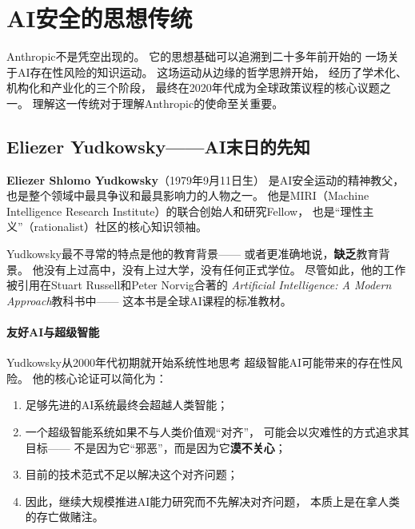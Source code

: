 \section{AI安全的思想传统}
\label{sec:safety-tradition}

Anthropic不是凭空出现的。
它的思想基础可以追溯到二十多年前开始的
一场关于AI存在性风险的知识运动。
这场运动从边缘的哲学思辨开始，
经历了学术化、机构化和产业化的三个阶段，
最终在2020年代成为全球政策议程的核心议题之一。
理解这一传统对于理解Anthropic的使命至关重要。

\subsection{Eliezer Yudkowsky——AI末日的先知}
\label{subsec:yudkowsky}

\textbf{Eliezer Shlomo Yudkowsky}（1979年9月11日生）
是AI安全运动的精神教父，
也是整个领域中最具争议和最具影响力的人物之一。
他是MIRI（Machine Intelligence Research Institute）的联合创始人和研究Fellow，
也是``理性主义''（rationalist）社区的核心知识领袖。

Yudkowsky最不寻常的特点是他的教育背景——
或者更准确地说，\textbf{缺乏}教育背景。
他没有上过高中，没有上过大学，没有任何正式学位。
尽管如此，他的工作被引用在Stuart Russell和Peter Norvig合著的
\textit{Artificial Intelligence: A Modern Approach}教科书中——
这本书是全球AI课程的标准教材。

\paragraph{友好AI与超级智能}
Yudkowsky从2000年代初期就开始系统性地思考
超级智能AI可能带来的存在性风险。
他的核心论证可以简化为：
\begin{enumerate}[noitemsep]
  \item 足够先进的AI系统最终会超越人类智能；
  \item 一个超级智能系统如果不与人类价值观``对齐''，
        可能会以灾难性的方式追求其目标——
        不是因为它``邪恶''，而是因为它\textbf{漠不关心}；
  \item 目前的技术范式不足以解决这个对齐问题；
  \item 因此，继续大规模推进AI能力研究而不先解决对齐问题，
        本质上是在拿人类的存亡做赌注。
\end{enumerate}

